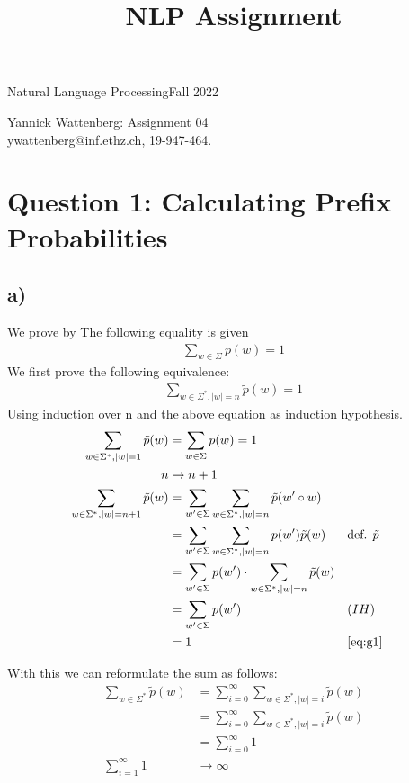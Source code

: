 \documentclass[a4paper,12pt]{ETHexercise}
\title{NLP Assignment}
\begin{document}



{}
{\Large Natural Language Processing}{Fall 2022}
\begin{center}
    {\Huge Yannick Wattenberg: Assignment 04}\\
      \quad\newline
      ywattenberg@inf.ethz.ch, 19-947-464.\\
      \quad\newline
    \timestamp

\end{center}
\section*{Question 1: Calculating Prefix Probabilities}
\subsection*{a)}
We prove by 
The following equality is given
\begin{align}
    \sum_{w \in \Sigma} p(w) = 1 \label{eq:g1}
\end{align}
We first prove the following equivalence:
\begin{align}
    \sum_{w \in \Sigma^*, |w| = n} \tilde{p}(w) = 1
\end{align}
Using induction over n and the above equation as induction hypothesis.
\begin{align}
    \sum_{w \in \Sigma^*, |w| = 1} \tilde{p}(w) &= \sum_{w \in \Sigma} p(w) = 1\\
    n &\rightarrow n+1 \nonumber\\
    \sum_{w \in \Sigma^*, |w| = n+1} \tilde{p}(w) &=  \sum_{w' \in \Sigma}\sum_{w \in \Sigma^*, |w| = n} \tilde{p}(w' \circ w)\\
    &= \sum_{w' \in \Sigma}\sum_{w \in \Sigma^*, |w| = n} p(w')\tilde{p}(w) &&\text{def. }\tilde{p}\\
    &= \sum_{w' \in \Sigma}  p(w') \cdot \sum_{w \in \Sigma^*, |w| = n}\tilde{p}(w)\\
    &= \sum_{w' \in \Sigma}  p(w') &&(IH)\\
    &= 1 &&\ref{eq:g1}
\end{align}

With this we can reformulate the sum as follows:
\begin{align}
    \sum_{w \in \Sigma^*} \tilde{p}(w) &= \sum_{i=0}^{\infty} \sum_{w \in \Sigma^*, |w| = i} \tilde{p}(w)\\
    &=   \sum_{i=0}^{\infty} \sum_{w \in \Sigma^*, |w| = i} \tilde{p}(w)\\
    &=   \sum_{i=0}^{\infty} 1\\
     \sum_{i=1}^{\infty} 1 &\rightarrow \infty
\end{align}
\end{document}
